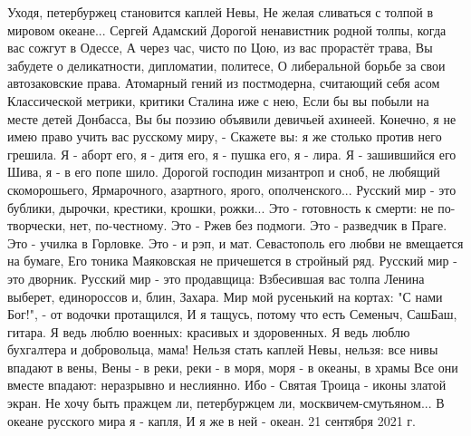 Уходя, петербуржец становится каплей Невы,
Не желая сливаться с толпой в мировом океане... Сергей Адамский
Дорогой ненавистник родной толпы, когда вас сожгут в Одессе,
А через час, чисто по Цою, из вас прорастёт трава,
Вы забудете о деликатности, дипломатии, политесе,
О либеральной борьбе за свои автозаковские права.
Атомарный гений из постмодерна, считающий себя асом
Классической метрики, критики Сталина иже с нею,
Если бы вы побыли на месте детей Донбасса,
Вы бы поэзию объявили девичьей ахинеей.
Конечно, я не имею право учить вас русскому миру, -
Скажете вы: я же столько против него грешила.
Я - аборт его, я - дитя его, я - пушка его, я - лира.
Я - зашившийся его Шива, я - в его попе шило.
Дорогой господин мизантроп и сноб, не любящий скоморошьего,
Ярмарочного, азартного, ярого, ополченского...
Русский мир - это бублики, дырочки, крестики, крошки, рожки...
Это - готовность к смерти: не по-творчески, нет, по-честному.
Это - Ржев без подмоги. Это - разведчик в Праге.
Это - училка в Горловке. Это - и рэп, и мат.
Севастополь его любви не вмещается на бумаге,
Его тоника Маяковская не причешется в стройный ряд.
Русский мир - это дворник. Русский мир - это продавщица:
Взбесившая вас толпа Ленина выберет, единороссов и, блин, Захара.
Мир мой русенький на кортах: "С нами Бог!", - от водочки протащился,
И я тащусь, потому что есть Семеныч, СашБаш, гитара.
Я ведь люблю военных: красивых и здоровенных.
Я ведь люблю бухгалтера и добровольца, мама!
Нельзя стать каплей Невы, нельзя: все нивы впадают в вены,
Вены - в реки, реки - в моря, моря - в океаны, в храмы
Все они вместе впадают: неразрывно и неслиянно.
Ибо - Святая Троица - иконы златой экран.
Не хочу быть пражцем ли, петербуржцем ли, москвичем-смутьяном...
В океане русского мира я - капля,
И я же в ней - океан.
21 сентября 2021 г.
